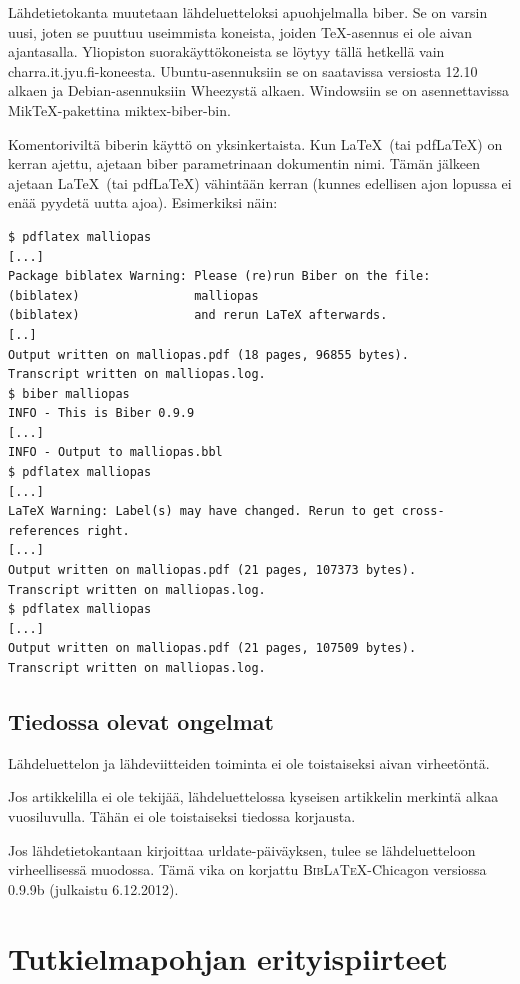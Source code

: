 \documentclass[utf8,bachelor]{gradu3}
\begin{document}
Lähdetietokanta muutetaan lähdeluetteloksi apuohjelmalla {biber}.  Se
on varsin uusi, joten se puuttuu useimmista koneista, joiden
\TeX-asennus ei ole aivan ajantasalla.  Yliopiston suorakäyttökoneista
se löytyy tällä hetkellä vain charra.it.jyu.fi-koneesta.
Ubuntu-asennuksiin se on saatavissa versiosta 12.10 alkaen ja
Debian-asennuksiin Wheezystä alkaen.  Windowsiin se on asennettavissa
MikTeX-pakettina miktex-biber-bin.

Komentoriviltä biberin käyttö on yksinkertaista.  Kun \LaTeX\ (tai
pdf\LaTeX) on kerran ajettu, ajetaan biber parametrinaan dokumentin
nimi.  Tämän jälkeen ajetaan \LaTeX\ (tai pdf\LaTeX) vähintään kerran
(kunnes edellisen ajon lopussa ei enää pyydetä uutta ajoa).
Esimerkiksi näin:

\begingroup\footnotesize
\begin{verbatim}
$ pdflatex malliopas
[...]
Package biblatex Warning: Please (re)run Biber on the file:
(biblatex)                malliopas
(biblatex)                and rerun LaTeX afterwards.
[..]
Output written on malliopas.pdf (18 pages, 96855 bytes).
Transcript written on malliopas.log.
$ biber malliopas
INFO - This is Biber 0.9.9
[...]
INFO - Output to malliopas.bbl
$ pdflatex malliopas
[...]
LaTeX Warning: Label(s) may have changed. Rerun to get cross-references right.
[...]
Output written on malliopas.pdf (21 pages, 107373 bytes).
Transcript written on malliopas.log.
$ pdflatex malliopas
[...]
Output written on malliopas.pdf (21 pages, 107509 bytes).
Transcript written on malliopas.log.
\end{verbatim}
\endgroup

\section{Tiedossa olevat ongelmat}

Lähdeluettelon ja lähdeviitteiden toiminta ei ole toistaiseksi aivan
virheetöntä.

Jos artikkelilla ei ole tekijää, lähdeluettelossa kyseisen artikkelin
merkintä alkaa vuosiluvulla.  Tähän ei ole toistaiseksi tiedossa
korjausta.

Jos lähdetietokantaan kirjoittaa urldate-päiväyksen, tulee se
lähdeluetteloon virheellisessä muodossa.  Tämä vika on korjattu
\textsc{Bib\LaTeX}-Chicagon versiossa 0.9.9b (julkaistu 6.12.2012).

\chapter{Tutkielmapohjan erityispiirteet}
\end{document}
